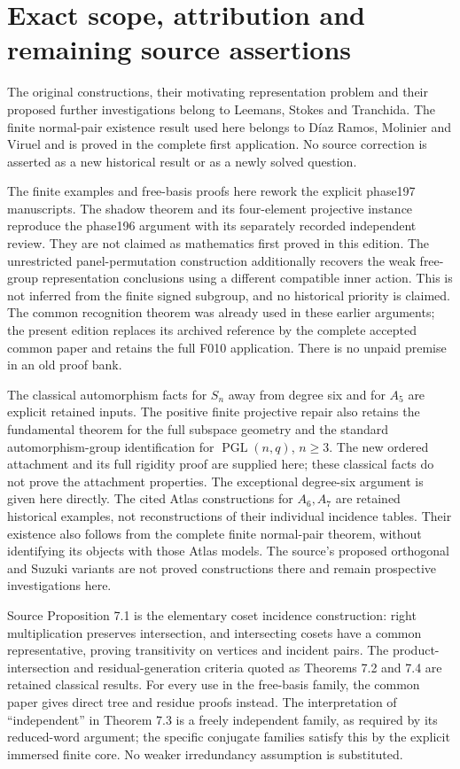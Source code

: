 \section{Exact scope, attribution and remaining source assertions}
The original constructions, their motivating representation problem and
their proposed further investigations belong to Leemans, Stokes and
Tranchida. The finite normal-pair existence result used here belongs to
D\'iaz Ramos, Molinier and Viruel and is proved in the complete first
application. No source correction is asserted as a new historical
result or as a newly solved question.

The finite examples and free-basis proofs here rework the explicit
phase197 manuscripts. The shadow theorem and its four-element projective
instance reproduce the phase196 argument with its separately recorded
independent review. They are not claimed as mathematics first proved
in this edition. The unrestricted panel-permutation construction additionally recovers the
weak free-group representation conclusions using a different compatible
inner action. This is not inferred from the finite signed subgroup, and
no historical priority is claimed.
The common recognition theorem was already used in
these earlier arguments; the present edition replaces its archived
reference by the complete accepted common paper and retains the full
F010 application. There is no unpaid premise in an old proof bank.

The classical automorphism facts for $S_n$ away from degree six and for
$A_5$ are explicit retained inputs. The positive finite projective repair
also retains the fundamental theorem for the full subspace geometry and
the standard automorphism-group identification for $\operatorname{PGL}(n,q)$,
$n\ge3$. The new ordered attachment and its full rigidity proof are supplied
here; these classical facts do not prove the attachment properties. The exceptional degree-six argument
is given here directly. The cited Atlas constructions for $A_6,A_7$ are
retained historical examples, not reconstructions of their individual
incidence tables. Their existence also follows from the complete finite
normal-pair theorem, without identifying its objects with those Atlas
models. The source's proposed orthogonal and Suzuki variants are not
proved constructions there and remain prospective investigations here.

Source Proposition 7.1 is the elementary coset incidence construction:
right multiplication preserves intersection, and intersecting cosets
have a common representative, proving transitivity on vertices and
incident pairs. The product-intersection and residual-generation criteria
quoted as Theorems 7.2 and 7.4 are retained classical results. For every
use in the free-basis family, the common paper gives direct tree and
residue proofs instead. The interpretation of ``independent'' in
Theorem 7.3 is a freely independent family, as required by its reduced-word
argument; the specific conjugate families satisfy this by the explicit
immersed finite core. No weaker irredundancy assumption is substituted.


